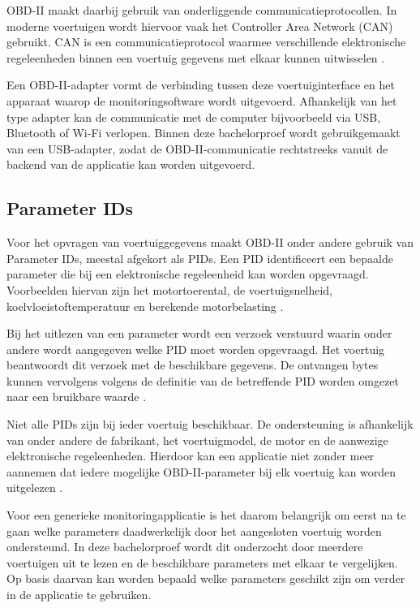 OBD-II maakt daarbij gebruik van onderliggende communicatieprotocollen. In
moderne voertuigen wordt hiervoor vaak het Controller Area Network (CAN)
gebruikt. CAN is een communicatieprotocol waarmee verschillende elektronische
regeleenheden binnen een voertuig gegevens met elkaar kunnen uitwisselen
\autocite{CSSElectronicsCANBus2025}.

Een OBD-II-adapter vormt de verbinding tussen deze voertuiginterface en het
apparaat waarop de monitoringsoftware wordt uitgevoerd. Afhankelijk van het
type adapter kan de communicatie met de computer bijvoorbeeld via USB,
Bluetooth of Wi-Fi verlopen. Binnen deze bachelorproef wordt gebruikgemaakt
van een USB-adapter, zodat de OBD-II-communicatie rechtstreeks vanuit de
backend van de applicatie kan worden uitgevoerd.

\subsection{Parameter IDs}
Voor het opvragen van voertuiggegevens maakt OBD-II onder andere gebruik van
Parameter IDs, meestal afgekort als PIDs. Een PID identificeert een bepaalde
parameter die bij een elektronische regeleenheid kan worden opgevraagd.
Voorbeelden hiervan zijn het motortoerental, de voertuigsnelheid,
koelvloeistoftemperatuur en berekende motorbelasting
\autocite{CSSElectronicsOBD2025,mccord2011automotive}.

Bij het uitlezen van een parameter wordt een verzoek verstuurd waarin onder
andere wordt aangegeven welke PID moet worden opgevraagd. Het voertuig
beantwoordt dit verzoek met de beschikbare gegevens. De ontvangen bytes kunnen
vervolgens volgens de definitie van de betreffende PID worden omgezet naar een
bruikbare waarde \autocite{RFWirelessWorld2026}.

Niet alle PIDs zijn bij ieder voertuig beschikbaar. De ondersteuning is
afhankelijk van onder andere de fabrikant, het voertuigmodel, de motor en de
aanwezige elektronische regeleenheden. Hierdoor kan een applicatie niet zonder
meer aannemen dat iedere mogelijke OBD-II-parameter bij elk voertuig kan worden
uitgelezen \autocite{RIMPAS202055,Pmc2025}.

Voor een generieke monitoringapplicatie is het daarom belangrijk om eerst na te
gaan welke parameters daadwerkelijk door het aangesloten voertuig worden
ondersteund. In deze bachelorproef wordt dit onderzocht door meerdere
voertuigen uit te lezen en de beschikbare parameters met elkaar te vergelijken.
Op basis daarvan kan worden bepaald welke parameters geschikt zijn om verder in
de applicatie te gebruiken.

